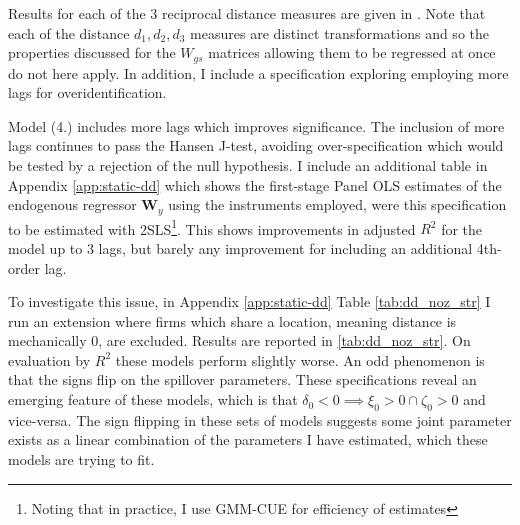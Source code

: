 Results for each of the 3 reciprocal distance measures are given in .
Note that each of the distance $d_1, d_2, d_3$ measures are distinct transformations
and so the properties discussed for the $W_{gs}$ matrices allowing them to be regressed at once
do not here apply.
In addition, I include a specification exploring employing more lags
for overidentification.
\begin{table}[hbtp]
    \centering
    \begin{threeparttable}
        \caption{Static panel IV using continuous distance-decay $\mathbf W_d$}
        \label{tab:dd-basic-str}
        
    \end{threeparttable}
\end{table}

Model (4.) includes more lags which improves significance.
The inclusion of more lags continues to pass the Hansen J-test,
avoiding over-specification which would be tested by a rejection of the null hypothesis.
I include an additional table in Appendix \ref{app:static-dd}
which shows the first-stage Panel OLS estimates of the endogenous regressor $\mathbf W_y$
using the instruments employed,
were this specification to be estimated with 2SLS\footnote{Noting that in practice,
I use GMM-CUE for efficiency of estimates}.
This shows improvements in adjusted $R^2$ for the model up to 3 lags,
but barely any improvement for including an additional 4th-order lag.
\par
\pagebreak
To investigate this issue, in Appendix \ref{app:static-dd} Table \ref{tab:dd_noz_str}
I run an extension where firms which share a location,
meaning distance is mechanically 0, are excluded.
Results are reported in \ref{tab:dd_noz_str}.
On evaluation by $R^2$ these models perform slightly worse.
An odd phenomenon is that the signs flip on the spillover parameters.
These specifications reveal an emerging feature of these models,
which is that $\delta_0<0 \implies \xi_0>0 \cap \zeta_0>0$ and vice-versa.
The sign flipping in these sets of models suggests some joint parameter
exists as a linear combination of the parameters I have estimated,
which these models are trying to fit. 